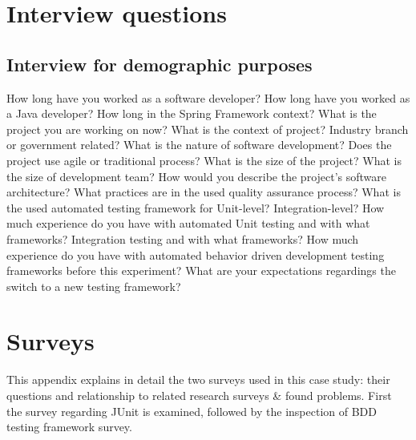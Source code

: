 \chapter{Interview questions}
\label{chapter:interview}
\section{Interview for demographic purposes}
    \label{section:demographic}
    \begin{outline}[enumerate]
    \1 How long have you worked as a software developer?
    \1 How long have you worked as a Java developer?
        \2 How long in the Spring Framework context?
    \1 What is the project you are working on now?
        \2 What is the context of project?
            \3 Industry branch or government related?
            \3 What is the nature of software development?
        \2 Does the project use agile or traditional process?
        \2 What is the size of the project?
        \2 What is the size of development team?
        \2 How would you describe the project's software architecture?
        \2 What practices are in the used quality assurance process?
        \2 What is the used automated testing framework for
            \3 Unit-level?
            \3 Integration-level?
    \1 How much experience do you have with automated
        \2 Unit testing and with what frameworks?
        \2 Integration testing and with what frameworks?
    \1 How much experience do you have with automated behavior driven development testing frameworks before this experiment?
    \1 What are your expectations regardings the switch to a new testing framework?
    \end{outline}

\chapter{Surveys}
\label{chapter:surveys}
This appendix explains in detail the two surveys used in this case study: their questions and relationship to related
research surveys \& found problems. First the survey regarding JUnit is examined, followed by the inspection of BDD testing
framework survey.
